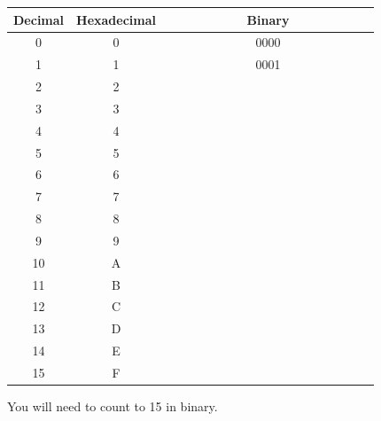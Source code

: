 \documentclass[letterpaper,12pt]{exam}
\begin{document}
\begin{center}
\begin{tabular}{| c | c | c |}
    \hline
        Decimal & Hexadecimal & \ \ \ \ \ \ \ \ \ \ \ Binary\ \ \ \ \ \ \ \ \ \ \ \\
        \hline
    0 & 0 & 0000 \\ 
    1 & 1 & 0001 \\  
\hline
    2 & 2 & \  \\ 
    3 & 3 & \  \\  
\hline
    4 & 4 & \  \\ 
    5 & 5 & \  \\  
\hline
    6 & 6 & \  \\ 
    7 & 7 & \  \\  
\hline
    8 & 8 & \  \\ 
    9 & 9 & \  \\  
\hline
    10 & A & \  \\ 
    11 & B & \  \\  
\hline
    12 & C & \  \\ 
    13 & D & \  \\  
\hline
    14 & E & \  \\ 
    15 & F & \  \\  
\hline
\end{tabular}
\par
You will need to count to 15 in binary.

\end{center}
\end{document}

